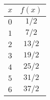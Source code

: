 \begin{tabular}{cc} \toprule
$x$  & $f(x)$   \\\midrule
$0$  & $1 / 2$  \\
$1$  & $7 / 2$  \\
$2$  & $13 / 2$ \\
$3$  & $19 / 2$ \\
$4$  & $25 / 2$ \\
$5$  & $31 / 2$ \\
$6$  & $37 / 2$ \\\bottomrule
\end{tabular}
